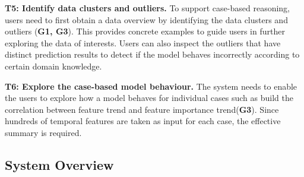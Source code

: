 \textbf{T5: Identify data clusters and outliers.}
To support case-based reasoning, users need to first obtain a data overview by identifying the data clusters and outliers (\textbf{G1, G3}).
This provides concrete examples to guide users in further exploring the data of interests.
Users can also inspect the outliers that have distinct prediction results to detect if the model behaves incorrectly according to certain domain knowledge.

\textbf{T6: Explore the case-based model behaviour.}
The system needs to enable the users to explore how a model behaves for individual cases such as build the correlation between feature trend and feature importance trend(\textbf{G3}). 
Since hundreds of temporal features are taken as input for each case, the effective summary is required.





\subsection{System Overview}

